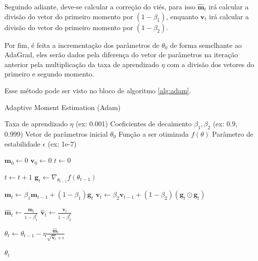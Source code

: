 Seguindo adiante, deve-se calcular a correção do viés, para isso $\mathbf{\hat{m}}_t$ irá calcular a divisão do vetor do primeiro momento por $(1 - \beta_1)$, enquanto $\mathbf{\hat{v}}_t$ irá calcular a divisão do vetor do primeiro momento por $(1 - \beta_2)$.

Por fim, é feita a incrementação dos parâmetros de $\theta_0$ de forma semelhante ao AdaGrad, eles serão dados pela diferença do vetor de parâmetros na iteração anterior pela multiplicação da taxa de aprendizado $\eta$ com a divisão dos vetores do primeiro e segundo momento.

Esse método pode ser visto no bloco de algoritmo \ref{alg:adam}.

\begin{algorithm}[H]
    \caption{Adaptive Moment Estimation (Adam)}
    \label{alg:adam}
    \begin{algorithmic}[1]

    \Require Taxa de aprendizado $\eta$ (ex: 0.001)
    \Require Coeficientes de decaimento $\beta_1, \beta_2$ (ex: 0.9, 0.999)
    \Require Vetor de parâmetros inicial $\theta_0$
    \Require Função a ser otimizada $f(\theta)$
    \Require Parâmetro de estabilidade $\epsilon$ (ex: 1e-7)

    \State $\mathbf{m}_0 \leftarrow 0$ 
    \State $\mathbf{v}_0 \leftarrow 0$ 
    \State $t \leftarrow 0$ 

        \State $t \leftarrow t + 1$
        \State $\mathbf{g}_t \leftarrow \nabla_{\theta_{t-1}} f(\theta_{t-1})$
        
        \State $\mathbf{m}_t \leftarrow \beta_1 \mathbf{m}_{t-1} + (1 - \beta_1) \mathbf{g}_t$
        \State $\mathbf{v}_t \leftarrow \beta_2 \mathbf{v}_{t-1} + (1 - \beta_2) (\mathbf{g}_t \odot \mathbf{g}_t)$
        
        \State $\mathbf{\hat{m}}_t \leftarrow \frac{\mathbf{m}_t}{1 - \beta_1^t}$
        \State $\mathbf{\hat{v}}_t \leftarrow \frac{\mathbf{v}_t}{1 - \beta_2^t}$
        
        \State $\theta_t \leftarrow \theta_{t-1} - \eta  \frac{\mathbf{\hat{m}}_t}{\sqrt{\mathbf{\hat{v}}_t} + \epsilon}$
    \EndWhile

    \State \Return $\theta_t$ 
    \end{algorithmic}
\end{algorithm}

